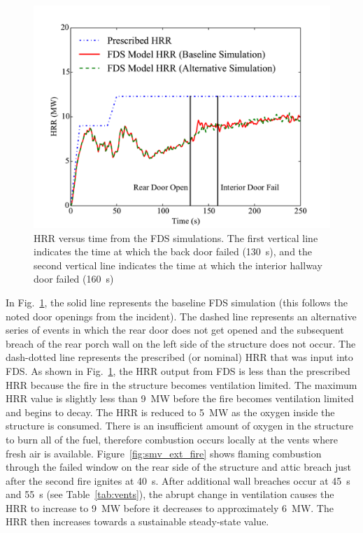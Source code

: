 \begin{figure}[!ht]
\centering
\includegraphics[width=.80\textwidth]{../Figures/Chicago_Fire_HRR}
\caption[HRR versus time from the FDS simulations.]{HRR versus time from the FDS simulations. The first vertical line indicates the time at which the back door failed (130~s), and the second vertical line indicates the time at which the interior hallway door failed (160~s)}
\label{fig:hrr}
\end{figure}

In Fig.~\ref{fig:hrr}, the solid line represents the baseline FDS simulation (this follows the noted door openings from the incident). The dashed line represents an alternative series of events in which the rear door does not get opened and the subsequent breach of the rear porch wall on the left side of the structure does not occur. The dash-dotted line represents the prescribed (or nominal) HRR that was input into FDS. As shown in Fig.~\ref{fig:hrr}, the HRR output from FDS is less than the prescribed HRR because the fire in the structure becomes ventilation limited. The maximum HRR value is slightly less than 9~MW before the fire becomes ventilation limited and begins to decay. The HRR is reduced to 5~MW as the oxygen inside the structure is consumed. There is an insufficient amount of oxygen in the structure to burn all of the fuel, therefore combustion occurs locally at the vents where fresh air is available. Figure~\ref{fig:smv_ext_fire} shows flaming combustion through the failed window on the rear side of the structure and attic breach just after the second fire ignites at 40~s. After additional wall breaches occur at 45~s and 55~s (see Table~\ref{tab:vents}), the abrupt change in ventilation causes the HRR to increase to 9~MW before it decreases to approximately 6~MW. The HRR then increases towards a sustainable steady-state value.


